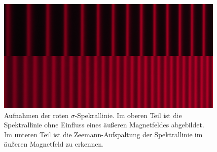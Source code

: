 \FloatBarrier
\begin{figure}[!h]
\centering
\includegraphics[scale=0.1]{../Grafiken/1-I0_t15_sigma_2-I10_t15_sigma.jpg}
\caption{Aufnahmen der roten $\sigma$-Spekrallinie. Im oberen Teil ist die
        Spektrallinie ohne Einfluss eines äußeren Magnetfeldes abgebildet.
        Im unteren Teil ist die Zeemann-Aufspaltung der Spektrallinie
        im äußeren Magnetfeld zu erkennen.\label{fig:1-i0_t15_sigma_2-i10_t15_sigma}}
\end{figure}
\FloatBarrier
